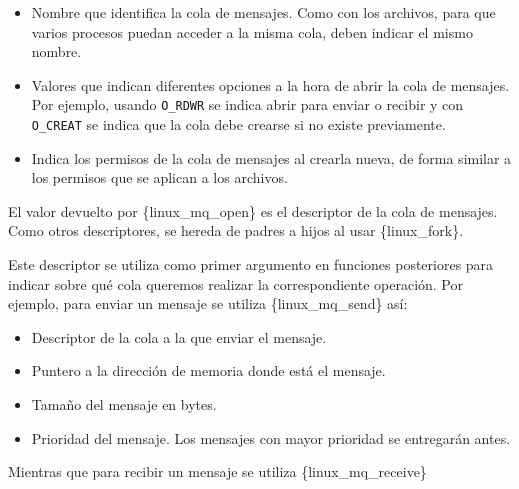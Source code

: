 \begin{itemize}
\item
  Nombre que identifica la cola de mensajes. Como con los archivos, para
  que varios procesos puedan acceder a la misma cola, deben indicar el
  mismo nombre.
\item
  Valores que indican diferentes opciones a la hora de abrir la cola de
  mensajes. Por ejemplo, usando \texttt{O\_RDWR} se indica abrir para
  enviar o recibir y con \texttt{O\_CREAT} se indica que la cola debe
  crearse si no existe previamente.
\item
  Indica los permisos de la cola de mensajes al crearla nueva, de forma
  similar a los permisos que se aplican a los archivos.
\end{itemize}

El valor devuelto por \{linux\_mq\_open\} es el descriptor de la cola de
mensajes. Como otros descriptores, se hereda de padres a hijos al usar
\{linux\_fork\}.

Este descriptor se utiliza como primer argumento en funciones
posteriores para indicar sobre qué cola queremos realizar la
correspondiente operación. Por ejemplo, para enviar un mensaje se
utiliza \{linux\_mq\_send\} así:

\begin{Shaded}
\begin{Highlighting}[]
\OperatorTok{(}
\OperatorTok{,}                 
    \OperatorTok{(}  \OperatorTok{*)\&}\OperatorTok{,} 
    \OperatorTok{(}\OperatorTok{),}        
\OperatorTok{);}
\end{Highlighting}
\end{Shaded}

\begin{itemize}
\item
  Descriptor de la cola a la que enviar el mensaje.
\item
  Puntero a la dirección de memoria donde está el mensaje.
\item
  Tamaño del mensaje en bytes.
\item
  Prioridad del mensaje. Los mensajes con mayor prioridad se entregarán
  antes.
\end{itemize}

Mientras que para recibir un mensaje se utiliza \{linux\_mq\_receive\}

\begin{Shaded}
\begin{Highlighting}[]
 \OperatorTok{;}

\OperatorTok{(}
\OperatorTok{,}                 
    \OperatorTok{(}  \OperatorTok{*)\&}\OperatorTok{,} 
    \OperatorTok{(}\OperatorTok{),}        
    \OperatorTok{\&}
\OperatorTok{);}
\end{Highlighting}
\end{Shaded}

